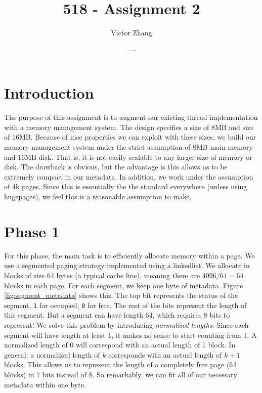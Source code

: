 \documentclass{article}
\title{518 - Assignment 2}
\author{Victor Zhang}
\date{----}
\begin{document}
\maketitle

\section{Introduction}
The purpose of this assignment is to augment our existing thread implementation
with a memory management system. The design specifies a  size
of 8MB and  size of 16MB. Because of nice properties we can exploit
with these sizes, we build our memory management system under the strict
assumption of 8MB main memory and 16MB disk. That is, it is not easily scalable
to any larger size of memory or disk. The drawback is obvious, but the advantage
is this allows us to be extremely compact in our metadata. In addition, we work
under the assumption of 4k pages. Since this is essentially the the standard
everywhere (unless using hugepages), we feel this is a reasonable assumption to
make.

\section{Phase 1}
For this phase, the main task is to efficiently allocate memory within a page.
We use a segmented paging strategy implemented using a linkedlist. We allocate
in blocks of size 64 bytes (a typical cache line), meaning there are
$4096/64 = 64$ blocks in each page. For each segment, we keep one byte of
metadata. Figure \ref{fig:segment_metadata} shows this. The top bit represents
the status of the segment, \verb|1| for occupied, \verb|0| for free. The rest of
the bits represent the length of this segment. But a segment can have length 64,
which requires 8 bits to represent! We solve this problem by introducing
\textit{normalized lengths}. Since each segment will have length at least 1, it
makes no sense to start counting from 1. A normalized length of 0 will
correspond with an actual length of 1 block. In general, a normalized length of
$k$ corresponds with an actual length of $k+1$ blocks. This  allows us to
represent the length of a completely free page (64 blocks) in 7 bits instead of
8. So remarkably, we can fit all of our necessary metadata within one byte.
\end{document}
